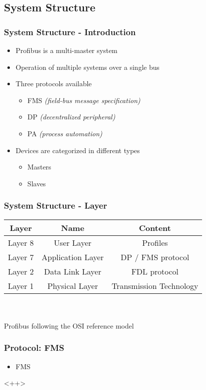 \documentclass{beamer}
\begin{document}
\subsection{System Structure}
\begin{frame}
  \frametitle{System Structure - Introduction}
  \begin{itemize}
    \item Profibus is a multi-master system
    \item Operation of multiple systems over a single bus
    \item Three protocols available
      \begin{itemize}
        \item FMS \textit{(field-bus message specification)}
        \item DP \textit{(decentralized peripheral)}
        \item PA \textit{(process automation)}
      \end{itemize}
    \item Devices are categorized in different types
      \begin{itemize}
        \item Masters
        \item Slaves
      \end{itemize}
  \end{itemize}
\end{frame}

\begin{frame}
  \frametitle{System Structure - Layer}
  \begin{tabular}[h]{c|c|c}
    \textbf{Layer}  & \textbf{Name}     & \textbf{Content} \\
    \hline
    Layer 8         & User Layer        & Profiles \\
    Layer 7         & Application Layer & DP / FMS protocol \\
    Layer 2         & Data Link Layer   & FDL protocol \\
    Layer 1         & Physical Layer    & Transmission Technology
  \end{tabular} \\
  \hfill \\
  Profibus following the OSI reference model\cite{profibusmanual}
\end{frame}

\begin{frame}
  \frametitle{Protocol: FMS}
  \begin{itemize}
    \item FMS
  \end{itemize}<++>
\end{frame}
\end{document}

